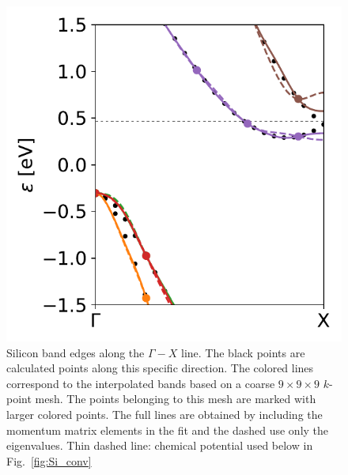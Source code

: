 \documentclass[final,5p,times,twocolumn,sort&compress]{elsarticle}
\newcounter{bla}
\begin{document}
\begin{figure}[htb]
\begin{center}
\includegraphics[width=.9\columnwidth]{Si_pocket}
\end{center}
\caption{Silicon band edges along the $\Gamma-X$ line. The black points are calculated points along this specific direction. The colored lines correspond to the interpolated bands based on a coarse $9\times9\times9$ $k$-point mesh. The points belonging to this mesh are marked with larger colored points. The full lines are obtained by including the momentum matrix elements in the fit and the dashed use only the eigenvalues. Thin dashed line: chemical potential used below in Fig.~\ref{fig:Si_conv}}
\label{fig:Si_pocket}
\end{figure}
\end{document}
